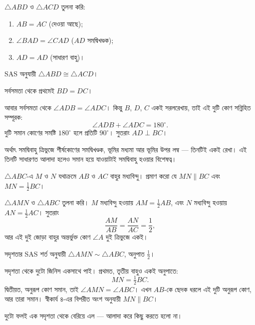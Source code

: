 \documentclass[11pt]{article}
\begin{document}
\begin{sol}
$\triangle ABD$ ও $\triangle ACD$ তুলনা করি:
\begin{enumerate}
  \item $AB = AC$ (দেওয়া আছে);
  \item $\angle BAD = \angle CAD$ ($AD$ সমদ্বিখণ্ডক);
  \item $AD = AD$ (সাধারণ বাহু)।
\end{enumerate}
SAS অনুযায়ী $\triangle ABD \cong \triangle ACD$।

সর্বসমতা থেকে প্রথমেই $BD = DC$।

আবার সর্বসমতা থেকে $\angle ADB = \angle ADC$। কিন্তু $B$, $D$, $C$ একই সরলরেখায়,
তাই এই দুটি কোণ সন্নিহিত সম্পূরক:
\[
  \angle ADB + \angle ADC = 180^\circ .
\]
দুটি সমান কোণের সমষ্টি $180^\circ$ হলে প্রতিটি $90^\circ$। সুতরাং
$AD \perp BC$।

অর্থাৎ সমদ্বিবাহু ত্রিভুজে শীর্ষকোণের সমদ্বিখণ্ডক, ভূমির মধ্যমা আর ভূমির উপর
লম্ব --- তিনটিই একই রেখা। এই তিনটি সাধারণত আলাদা হলেও সমান হয়ে যাওয়াটাই সমদ্বিবাহু
হওয়ার বিশেষত্ব।
\end{sol}

 $\triangle ABC$-এ $M$ ও $N$ যথাক্রমে $AB$ ও $AC$ বাহুর মধ্যবিন্দু।
প্রমাণ করো যে $MN \parallel BC$ এবং $MN = \tfrac{1}{2} BC$।

\begin{center}
\end{center}

\begin{sol}
$\triangle AMN$ ও $\triangle ABC$ তুলনা করি। $M$ মধ্যবিন্দু হওয়ায়
$AM = \tfrac{1}{2}AB$, এবং $N$ মধ্যবিন্দু হওয়ায় $AN = \tfrac{1}{2}AC$। সুতরাং
\[
  \frac{AM}{AB} = \frac{AN}{AC} = \frac{1}{2},
\]
আর এই দুই জোড়া বাহুর অন্তর্ভুক্ত কোণ $\angle A$ দুই ত্রিভুজে একই।

সদৃশতার SAS শর্ত অনুযায়ী $\triangle AMN \sim \triangle ABC$, অনুপাত $\tfrac{1}{2}$।

সদৃশতা থেকে দুটো জিনিস একসাথে পাই। প্রথমত, তৃতীয় বাহুও একই অনুপাতে:
\[
  MN = \tfrac{1}{2} BC .
\]
দ্বিতীয়ত, অনুরূপ কোণ সমান, তাই $\angle AMN = \angle ABC$। এখন $AB$-কে ছেদক ধরলে
এই দুটি অনুরূপ কোণ, আর তারা সমান। স্বীকার্য ৪-এর বিপরীত অংশ অনুযায়ী
$MN \parallel BC$।

দুটো ফলই এক সদৃশতা থেকে বেরিয়ে এল --- আলাদা করে কিছু করতে হলো না।
\end{sol}
\end{document}
